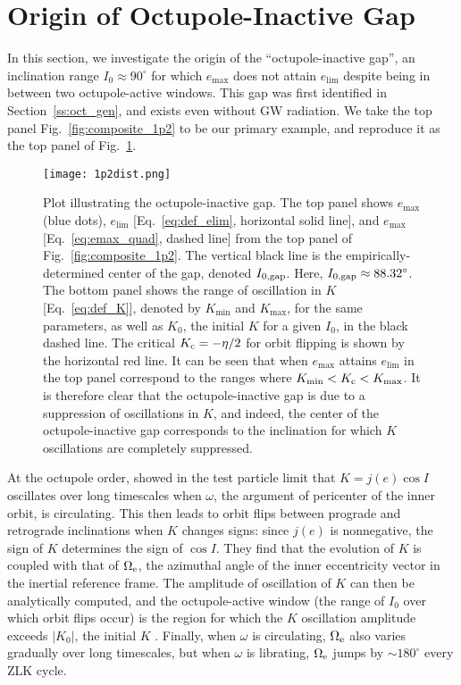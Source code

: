 \documentclass[
        fleqn,
        usenatbib,
    ]{mnras}
\newcommand*{\abs}[1]{\left|#1\right|}
\newlength{\colummwidth}
\begin{document}
\section{Origin of Octupole-Inactive Gap}\label{app:gap}

In this section, we investigate the origin of the ``octupole-inactive gap'', an
inclination range $I_0 \approx 90^\circ$ for which $e_{\max}$ does not attain
$e_{\lim}$ despite being in between two octupole-active windows. This gap was
first identified in Section~\ref{ss:oct_gen}, and exists even without GW
radiation. We take the top panel Fig.~\ref{fig:composite_1p2} to be our primary
example, and reproduce it as the top panel of Fig.~\ref{fig:kdist}.

\begin{figure}
    \centering
    \texttt{[image: 1p2dist.png]}
    \caption{Plot illustrating the octupole-inactive gap. The top panel shows
    $e_{\max}$ (blue dots), $e_{\lim}$ [Eq.~\eqref{eq:def_elim}, horizontal
    solid line], and $e_{\max}$ [Eq.~\eqref{eq:emax_quad}, dashed line]
    from the top panel of Fig.~\ref{fig:composite_1p2}. The vertical black line
    is the empirically-determined center of the gap, denoted $I_{\rm 0, gap}$.
    Here, $I_{\rm 0, gap} \approx 88.32^\circ$. The bottom panel shows the range of
    oscillation in $K$ [Eq.~\eqref{eq:def_K}], denoted by $K_{\min}$ and
    $K_{\max}$, for the same parameters, as well as $K_0$, the initial $K$ for a
    given $I_0$, in the black dashed line. The critical $K_{\rm c} = -\eta / 2$
    for orbit flipping is shown by the horizontal red line. It can be seen that
    when $e_{\max}$ attains $e_{\lim}$ in the top panel correspond to the ranges
    where $K_{\min} < K_{\rm c} < K_{\max}$. It is therefore clear that the
    octupole-inactive gap is due to a suppression of oscillations in $K$, and
    indeed, the center of the octupole-inactive gap corresponds to the
    inclination for which $K$ oscillations are completely suppressed.
    }\label{fig:kdist}
\end{figure}

At the octupole order, \citet{katz2011long} showed in the test particle limit
that $K = j(e) \cos I$ oscillates over long timescales when $\omega$, the
argument of pericenter of the inner orbit, is circulating. This then leads to
orbit flips between prograde and retrograde inclinations when $K$ changes signs:
since $j(e)$ is nonnegative, the sign of $K$ determines the sign of $\cos I$.
They find that the evolution of $K$ is coupled with that of $\Omega_{\rm e}$,
the azimuthal angle of the inner eccentricity vector in the inertial reference
frame. The amplitude of oscillation of $K$ can then be analytically computed,
and the octupole-active window (the range of $I_0$ over which orbit flips occur)
is the region for which the $K$ oscillation amplitude exceeds $\abs{K_0}$, the
initial $K$ \citep{katz2011long}. Finally, when $\omega$ is circulating,
$\Omega_{\rm e}$ also varies gradually over long timescales, but when $\omega$
is librating, $\Omega_{\rm e}$ jumps by $\sim 180^\circ$ every ZLK cycle.
\end{document}
